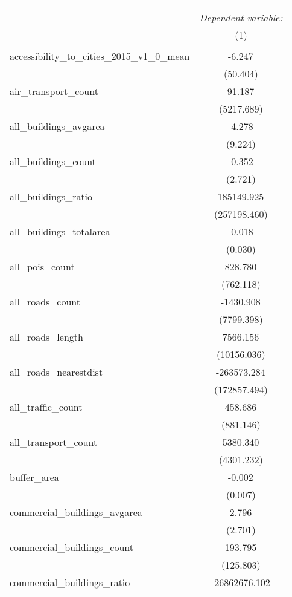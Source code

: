 \begin{table}[!htbp] \centering
\begin{tabular}{@{\extracolsep{5pt}}lc}
\\[-1.8ex]\hline
\hline \\[-1.8ex]
& \multicolumn{1}{c}{\textit{Dependent variable:}} \
\cr \cline{1-2}
\\[-1.8ex] & (1) \\
\hline \\[-1.8ex]
 accessibility_to_cities_2015_v1_0_mean & -6.247$^{}$ \\
  & (50.404) \\
 air_transport_count & 91.187$^{}$ \\
  & (5217.689) \\
 all_buildings_avgarea & -4.278$^{}$ \\
  & (9.224) \\
 all_buildings_count & -0.352$^{}$ \\
  & (2.721) \\
 all_buildings_ratio & 185149.925$^{}$ \\
  & (257198.460) \\
 all_buildings_totalarea & -0.018$^{}$ \\
  & (0.030) \\
 all_pois_count & 828.780$^{}$ \\
  & (762.118) \\
 all_roads_count & -1430.908$^{}$ \\
  & (7799.398) \\
 all_roads_length & 7566.156$^{}$ \\
  & (10156.036) \\
 all_roads_nearestdist & -263573.284$^{}$ \\
  & (172857.494) \\
 all_traffic_count & 458.686$^{}$ \\
  & (881.146) \\
 all_transport_count & 5380.340$^{}$ \\
  & (4301.232) \\
 buffer_area & -0.002$^{}$ \\
  & (0.007) \\
 commercial_buildings_avgarea & 2.796$^{}$ \\
  & (2.701) \\
 commercial_buildings_count & 193.795$^{}$ \\
  & (125.803) \\
 commercial_buildings_ratio & -26862676.102$^{}$ \\

\end{tabular}
\end{table}
